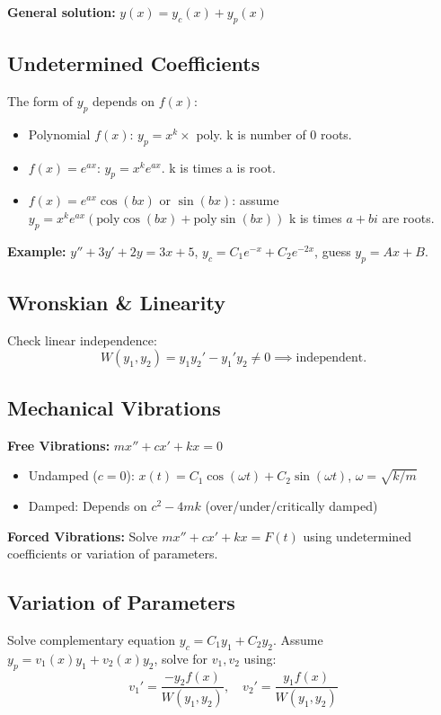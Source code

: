\begin{multicols}{2}
\textbf{General solution:} \( y(x) = y_c(x) + y_p(x) \)

\subsection*{Undetermined Coefficients}
The form of \( y_p \) depends on \( f(x) \):
\begin{itemize}
    \item Polynomial \( f(x) \): \( y_p = x^k \times \) poly. k is number of 0 roots.
    \item \( f(x) = e^{ax} \): \( y_p = x^k e^{ax} \). k is times a is root.
    \item \( f(x) = e^{ax} \cos(bx) \) or \( \sin(bx) \): assume \( y_p = x^k e^{ax}(\text{poly} \cos(bx) + \text{poly} \sin(bx)) \) k is times \( a+bi \) are roots.
\end{itemize}
\textbf{Example:} \( y'' + 3y' + 2y = 3x + 5 \), \( y_c = C_1 e^{-x} + C_2 e^{-2x} \), guess \( y_p = Ax + B \).

\subsection*{Wronskian \& Linearity}
Check linear independence: 
\[
W(y_1, y_2) = y_1y_2' - y_1'y_2 \neq 0 \implies \text{independent}.
\]

\subsection*{Mechanical Vibrations}
\textbf{Free Vibrations:} \( mx'' + cx' + kx = 0 \)
\begin{itemize}
    \item Undamped (\( c = 0 \)): \( x(t) = C_1 \cos(\omega t) + C_2 \sin(\omega t) \), \( \omega = \sqrt{k/m} \)
    \item Damped: Depends on \( c^2 - 4mk \) (over/under/critically damped)
\end{itemize}

\textbf{Forced Vibrations:} Solve \( mx'' + cx' + kx = F(t) \) using undetermined coefficients or variation of parameters.

\subsection*{Variation of Parameters}
Solve complementary equation \( y_c = C_1y_1 + C_2y_2 \). Assume \( y_p = v_1(x)y_1 + v_2(x)y_2 \), solve for \( v_1, v_2 \) using:
\[
v_1' = \frac{-y_2 f(x)}{W(y_1, y_2)}, \quad v_2' = \frac{y_1 f(x)}{W(y_1, y_2)}
\]

\end{multicols}

